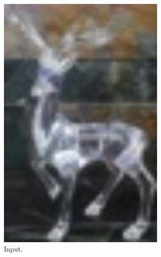 \documentclass[11pt]{article}
\theoremstyle{definition}
\theoremstyle{remark}
\theoremstyle{remark}
\theoremstyle{remark}
\begin{document}
\begin{figure}[H]
  \centering
  \begin{subfigure}[b]{0.32\textwidth}
    \centering \includegraphics[width=0.9\textwidth]{figs/input3.jpg}
    \caption{Input.}
  \end{subfigure}
  \begin{subfigure}[b]{0.32\textwidth}

\end{subfigure}
\end{figure}
\end{document}
